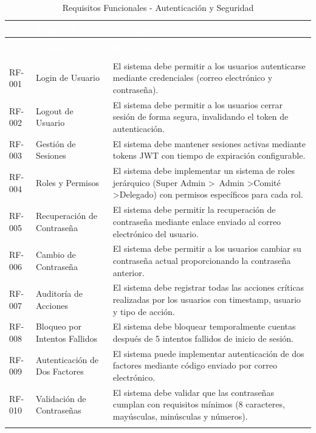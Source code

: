 \documentclass[12pt,a4paper]{article}
\begin{document}
\begin{longtable}{|>{\centering\arraybackslash}p{1.5cm}|>{\raggedright\arraybackslash}p{3.2cm}|>{\raggedright\arraybackslash}p{9cm}|}
\hline
\rowcolor{headercolor}
\textcolor{white}{\textbf{ID}} & \textcolor{white}{\textbf{Requisito}} & \textcolor{white}{\textbf{Descripción}} \\
\hline
\endfirsthead

\multicolumn{3}{c}{\textit{Continuación de la tabla anterior}} \\
\hline
\rowcolor{headercolor}
\textcolor{white}{\textbf{ID}} & \textcolor{white}{\textbf{Requisito}} & \textcolor{white}{\textbf{Descripción}} \\
\hline
\endhead

\hline
\multicolumn{3}{r}{\textit{Continúa en la siguiente página}} \\
\endfoot

\hline
\endlastfoot

RF-001 & Login de Usuario & El sistema debe permitir a los usuarios autenticarse mediante credenciales (correo electrónico y contraseña). \\
\hline
\rowcolor{rowgray}
RF-002 & Logout de Usuario & El sistema debe permitir a los usuarios cerrar sesión de forma segura, invalidando el token de autenticación. \\
\hline
RF-003 & Gestión de Sesiones & El sistema debe mantener sesiones activas mediante tokens JWT con tiempo de expiración configurable. \\
\hline
\rowcolor{rowgray}
RF-004 & Roles y Permisos & El sistema debe implementar un sistema de roles jerárquico (Super Admin \textgreater\ Admin \textgreater Comité \textgreater Delegado) con permisos específicos para cada rol. \\
\hline
RF-005 & Recuperación de Contraseña & El sistema debe permitir la recuperación de contraseña mediante enlace enviado al correo electrónico del usuario. \\
\hline
\rowcolor{rowgray}
RF-006 & Cambio de Contraseña & El sistema debe permitir a los usuarios cambiar su contraseña actual proporcionando la contraseña anterior. \\
\hline
RF-007 & Auditoría de Acciones & El sistema debe registrar todas las acciones críticas realizadas por los usuarios con timestamp, usuario y tipo de acción. \\
\hline
\rowcolor{rowgray}
RF-008 & Bloqueo por Intentos Fallidos & El sistema debe bloquear temporalmente cuentas después de 5 intentos fallidos de inicio de sesión. \\
\hline
RF-009 & Autenticación de Dos Factores & El sistema puede implementar autenticación de dos factores mediante código enviado por correo electrónico. \\
\hline
\rowcolor{rowgray}
RF-010 & Validación de Contraseñas & El sistema debe validar que las contraseñas cumplan con requisitos mínimos (8 caracteres, mayúsculas, minúsculas y números). \\
\hline
\caption{Requisitos Funcionales - Autenticación y Seguridad}
\end{longtable}
\end{document}

